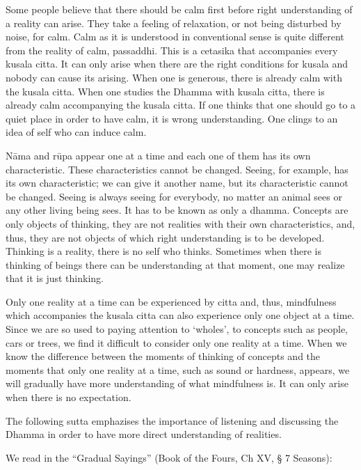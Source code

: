 Some people believe that there should be calm first before right understanding 
of a reality can arise. They take a feeling of relaxation, or not being disturbed by 
noise, for calm. Calm as it is understood in conventional sense is quite different 
from the reality of calm, passaddhi. This is a cetasika that accompanies every 
kusala citta. It can only arise when there are the right conditions for kusala and 
nobody can cause its arising. When one is generous, there is already calm with 
the kusala citta. When one studies the Dhamma with kusala citta, there is already calm accompanying the kusala citta. If one thinks that one should go to a 
quiet place in order to have calm, it is wrong understanding. One clings to an 
idea of self who can induce calm. 

Nāma and rūpa appear one at a time and each one of them has its own characteristic. These characteristics cannot be changed. Seeing, for example, has its own 
characteristic; we can give it another name, but its characteristic cannot be 
changed. Seeing is always seeing for everybody, no matter an animal sees or 
any other living being sees. It has to be known as only a dhamma. Concepts are 
only objects of thinking, they are not realities with their own characteristics, 
and, thus, they are not objects of which right understanding is to be developed. 
Thinking is a reality, there is no self who thinks. Sometimes when there is 
thinking of beings there can be understanding at that moment, one may realize 
that it is just thinking. 

Only one reality at a time can be experienced by citta and, thus, mindfulness 
which accompanies the kusala citta can also experience only one object at a 
time. Since we are so used to paying attention to `wholes', to concepts such as 
people, cars or trees, we find it difficult to consider only one reality at a time. 
When we know the difference between the moments of thinking of concepts and 
the moments that only one reality at a time, such as sound or hardness, appears, 
we will gradually have more understanding of what mindfulness is. It can only 
arise when there is no expectation. 

The following sutta emphazises the importance of listening and discussing the 
Dhamma in order to have more direct understanding of realities. 

We read in the ``Gradual Sayings'' (Book of the Fours, Ch XV, § 7 Seasons): 

